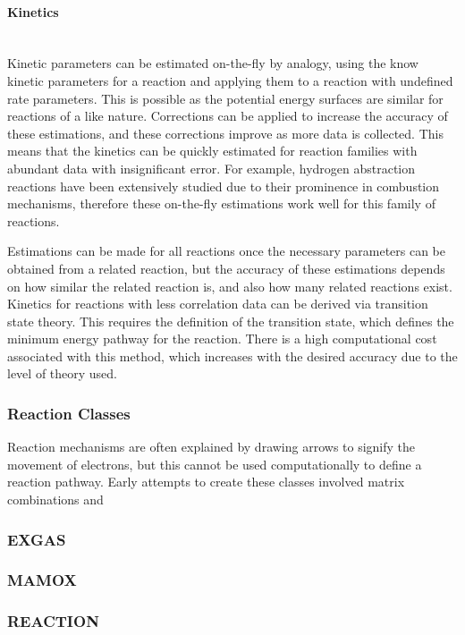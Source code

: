 \documentclass[12pt]{article}
\begin{document}
\paragraph{Kinetics}\mbox{}\\
Kinetic parameters can be estimated on-the-fly by analogy, using the know kinetic parameters for a reaction and applying them to a reaction with undefined rate parameters. This is possible as the potential energy surfaces are similar for reactions of a like nature. Corrections can be applied to increase the accuracy of these estimations, and these corrections improve as more data is collected. This means that the kinetics can be quickly estimated for reaction families with abundant data with insignificant error. For example, hydrogen abstraction reactions have been extensively studied due to their prominence in combustion mechanisms, therefore these on-the-fly estimations work well for this family of reactions.

Estimations can be made for all reactions once the necessary parameters can be obtained from a related reaction, but the accuracy of these estimations depends on how similar the related reaction is, and also how many related reactions exist. Kinetics for reactions with less correlation data can be derived via transition state theory. This requires the definition of the transition state, which defines the minimum energy pathway for the reaction. There is a high computational cost associated with this method, which increases with the desired accuracy due to the level of theory used.

\subsubsection{Reaction Classes}
Reaction mechanisms are often explained by drawing arrows to signify the movement of electrons, but this cannot be used computationally to define a reaction pathway. Early attempts to create these classes involved matrix combinations and 

\subsubsection{EXGAS}
\subsubsection{MAMOX}
\subsubsection{REACTION}
\end{document}
